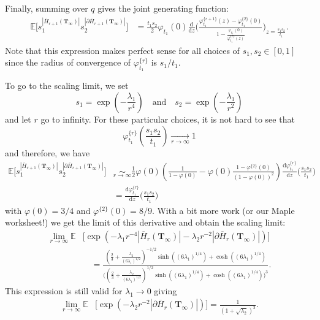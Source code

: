 \documentclass[AHL,XML,longabstracts,Unicode,NoSaveZebib]{cedram}
\begin{document}
Finally, summing over $q$ gives the joint generating function:
\begin{align*}
\mathbb E \Big[
s_1^{|\overline{H}_{r+1} (\mathbf{T}_{\infty})|} s_2^{|\partial \overline{H}_{r+1} (\mathbf{T}_{\infty})|} \Big]
& = \frac{t_1 s_2}{2} \varphi_{t_1} (0)
\frac{\mathrm d}{\mathrm{d}z} \Bigg(
\frac{\varphi_{t_1}^{\{r+1\}} (z)- \varphi^{\{2\}}_{t_1}(0) }
{1 - \frac{\varphi_{t_1} (0)}{\varphi_{t_1}^{\{r\}}(z)}}
\Bigg)_{z=\frac{s_1 s_2}{t_1}}.
\end{align*}
Note that this expression makes perfect sense for all choices of $s_1,s_2\in [0,1]$ since the radius of convergence of $\varphi_{t_1}^{\{r\}}$ is $s_1/t_1$.


To go to the scaling limit, we set
\[
s_1 = \exp \left( - \frac{\lambda_1}{r^4} \right) \quad \text{and} \quad s_2 = \exp \left( - \frac{\lambda_1}{r^2} \right)
\]
and let $r$ go to infinity. For these particular choices, it is not hard to see that
\[
\varphi_{t_1}^{\{r\}} \left( \frac{s_1 s_2}{t_1} \right) \underset{r \to \infty}{\longrightarrow} 1
\]
and therefore, we have
\begin{align*}
\mathbb E \Big[
s_1^{|\overline{H}_{r+1} (\mathbf{T}_{\infty})|} s_2^{|\partial \overline{H}_{r+1} (\mathbf{T}_{\infty})|} \Big]
& \underset{r \to \infty}{\sim}
\frac{1}{2} \varphi (0)
\left(\frac{1}{1-\varphi(0)} - \varphi(0) \frac{1-\varphi^{\{2\}}(0)}{(1-\varphi(0))^2} \right)
\frac{\mathrm d\varphi_{t_1}^{\{r\}}}{\mathrm{d}z} \Bigg(
\frac{s_1 s_2}{t_1}
\Bigg)\\
& =
\frac{\mathrm d\varphi_{t_1}^{\{r\}}}{\mathrm{d}z} \Bigg(
\frac{s_1 s_2}{t_1} \Bigg)
\end{align*}
with $\varphi(0) = 3/4$ and $\varphi^{\{2\}}(0) = 8/9$. With a bit more work (or our Maple worksheet!) we get the limit of this derivative and obtain the scaling limit:
\begin{align*}
\lim_{r \to \infty}
\mathbb E &\Big[
\exp \left(- \lambda_1 r^{-4}|\overline{H}_{r} (\mathbf{T}_{\infty})| - \lambda_2 r^{-2} |\partial \overline{H}_{r} (\mathbf{T}_{\infty})| \right)\Big]\\
& \quad =
\frac
{
\left(\frac{2}{3} + \frac{\lambda_2}{(6 \lambda_1)^{1/2}} \right)^{-1/2}
\sinh \left( (6 \lambda_1)^{1/4}\right) + \cosh \left( (6 \lambda_1)^{1/4}\right)
}
{\Bigg( \left(\frac{2}{3} + \frac{\lambda_2}{(6 \lambda_1)^{1/2}} \right)^{1/2}
\sinh \left( (6 \lambda_1)^{1/4}\right) + \cosh \left( (6 \lambda_1)^{1/4}\right)\Bigg)^3}.
\end{align*}
This expression is still valid for $\lambda_1 \to 0$ giving
\begin{align*}
\lim_{r \to \infty}
\mathbb E &\Big[
\exp \left(- \lambda_2 r^{-2} |\partial \overline{H}_{r} (\mathbf{T}_{\infty})| \right)\Big]
=
\frac{1}{\left( 1 + \sqrt{\lambda_2}\right)^3}.
\end{align*}
\end{document}
